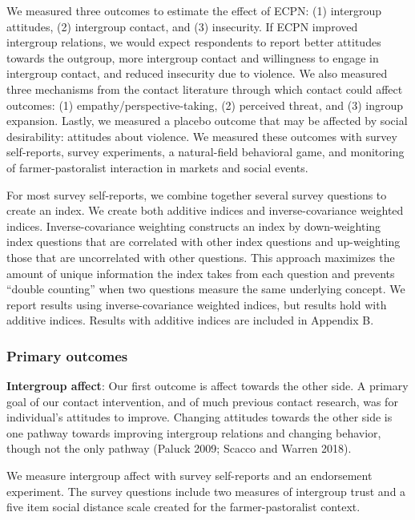 \documentclass[11pt]{article}
\begin{document}
We measured three outcomes to estimate the effect of ECPN: (1)
intergroup attitudes, (2) intergroup contact, and (3) insecurity. If
ECPN improved intergroup relations, we would expect respondents to
report better attitudes towards the outgroup, more intergroup contact
and willingness to engage in intergroup contact, and reduced insecurity
due to violence. We also measured three mechanisms from the contact
literature through which contact could affect outcomes: (1)
empathy/perspective-taking, (2) perceived threat, and (3) ingroup
expansion. Lastly, we measured a placebo outcome that may be affected by
social desirability: attitudes about violence. We measured these
outcomes with survey self-reports, survey experiments, a natural-field
behavioral game, and monitoring of farmer-pastoralist interaction in
markets and social events.

For most survey self-reports, we combine together several survey
questions to create an index. We create both additive indices and
inverse-covariance weighted indices. Inverse-covariance weighting
constructs an index by down-weighting index questions that are
correlated with other index questions and up-weighting those that are
uncorrelated with other questions. This approach maximizes the amount of
unique information the index takes from each question and prevents
``double counting'' when two questions measure the same underlying
concept. We report results using inverse-covariance weighted indices,
but results hold with additive indices. Results with additive indices
are included in Appendix B.

\hypertarget{primary-outcomes}{%
\subsubsection{Primary outcomes}\label{primary-outcomes}}

\textbf{Intergroup affect}: Our first outcome is affect towards the
other side. A primary goal of our contact intervention, and of much
previous contact research, was for individual's attitudes to improve.
Changing attitudes towards the other side is one pathway towards
improving intergroup relations and changing behavior, though not the
only pathway (Paluck 2009; Scacco and Warren 2018).

We measure intergroup affect with survey self-reports and an endorsement
experiment. The survey questions include two measures of intergroup
trust and a five item social distance scale created for the
farmer-pastoralist context.
\end{document}
